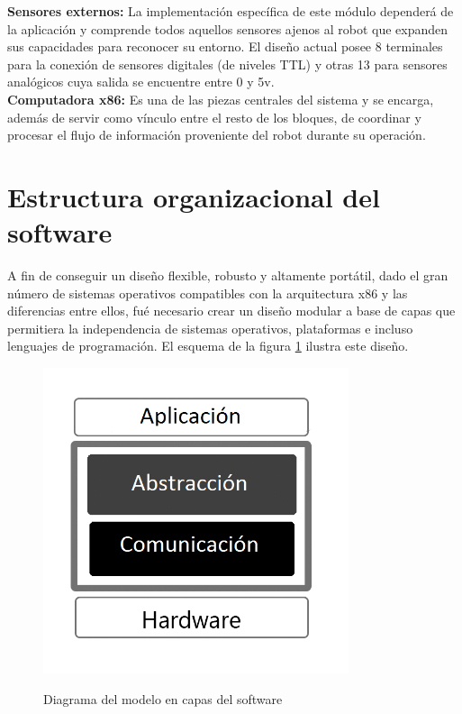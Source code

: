 \documentclass[letterpaper,openright,12pt]{book}
\begin{document}
\textbf{Sensores externos:} La implementación específica de este módulo dependerá de la aplicación y comprende todos aquellos sensores ajenos al robot que expanden sus capacidades para reconocer su entorno. El diseño actual posee 8 terminales para la conexión de sensores digitales (de niveles TTL) y otras 13 para sensores analógicos cuya salida se encuentre entre 0 y 5v. \\
\textbf{Computadora x86:} Es una de las piezas centrales del sistema y se encarga, además de servir como vínculo entre el resto de los bloques, de coordinar y procesar el flujo de información proveniente del robot durante su operación.\\  


\section{Estructura organizacional del software}
A fin de conseguir un diseño flexible, robusto y altamente portátil, dado el gran número de sistemas operativos compatibles con la arquitectura x86 y las diferencias entre ellos, fué necesario crear un diseño modular a base de capas que permitiera la independencia de sistemas operativos, plataformas e incluso lenguajes de programación. El esquema de la figura \ref{fig:capasSoftware} ilustra este diseño.

\begin{figure}
\begin{center}
\includegraphics[width=0.8\textwidth]{figures/capas.png}
\caption{Diagrama del modelo en capas del software}
\centering
\label{fig:capasSoftware}
\end{center}
\end{figure}
\end{document}
